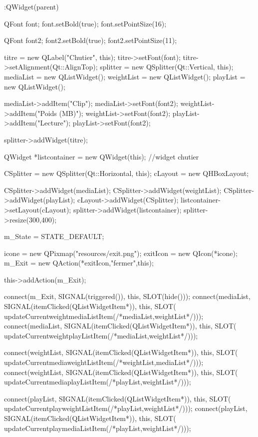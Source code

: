 \begin{DoxyCode}
                               :QWidget(parent)
{

   QFont font;
   font.setBold(true);
   font.setPointSize(16);

   QFont font2;
   font2.setBold(true);
   font2.setPointSize(11);

   titre = new QLabel("Chutier", this);
   titre->setFont(font);
   titre->setAlignment(Qt::AlignTop);
   splitter = new QSplitter(Qt::Vertical, this);
   mediaList = new QListWidget();
   weightList = new QListWidget();
   playList = new QListWidget();


   mediaList->addItem("Clip");
   mediaList->setFont(font2);
   weightList->addItem("Poids (MB)");
   weightList->setFont(font2);
   playList->addItem("Lecture");
   playList->setFont(font2);

   splitter->addWidget(titre);

   QWidget *listcontainer = new QWidget(this); //widget chutier

   CSplitter = new QSplitter(Qt::Horizontal, this);
   cLayout = new QHBoxLayout;

   CSplitter->addWidget(mediaList);
   CSplitter->addWidget(weightList);
   CSplitter->addWidget(playList);
   cLayout->addWidget(CSplitter);
   listcontainer->setLayout(cLayout);
   splitter->addWidget(listcontainer);
   splitter->resize(300,400);

   m_State = STATE_DEFAULT;

   icone = new QPixmap("resources/exit.png");
   exitIcon = new QIcon(*icone);
   m_Exit = new QAction(*exitIcon,"fermer",this);

   this->addAction(m_Exit);

   connect(m_Exit, SIGNAL(triggered()), this, SLOT(hide()));
   connect(mediaList, SIGNAL(itemClicked(QListWidgetItem*)), this, SLOT(
      updateCurrentweightmediaListItem(/*mediaList,weightList*/)));
   connect(mediaList, SIGNAL(itemClicked(QListWidgetItem*)), this, SLOT(
      updateCurrentweightplayListItem(/*mediaList,weightList*/)));

   connect(weightList, SIGNAL(itemClicked(QListWidgetItem*)), this, SLOT(
      updateCurrentmediaweightListItem(/*weightList,mediaList*/)));
   connect(weightList, SIGNAL(itemClicked(QListWidgetItem*)), this, SLOT(
      updateCurrentmediaplayListItem(/*playList,weightList*/)));

   connect(playList, SIGNAL(itemClicked(QListWidgetItem*)), this, SLOT(
      updateCurrentplayweightListItem(/*playList,weightList*/)));
   connect(playList, SIGNAL(itemClicked(QListWidgetItem*)), this, SLOT(
      updateCurrentplaymediaListItem(/*playList,weightList*/)));

}
\end{DoxyCode}
